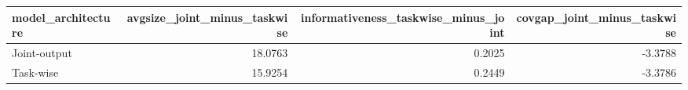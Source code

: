 \begin{tabular}{lrrr}
\toprule
model_architecture & avgsize_joint_minus_taskwise & informativeness_taskwise_minus_joint & covgap_joint_minus_taskwise \\
\midrule
Joint-output & 18.0763 & 0.2025 & -3.3788 \\
Task-wise & 15.9254 & 0.2449 & -3.3786 \\
\bottomrule
\end{tabular}
